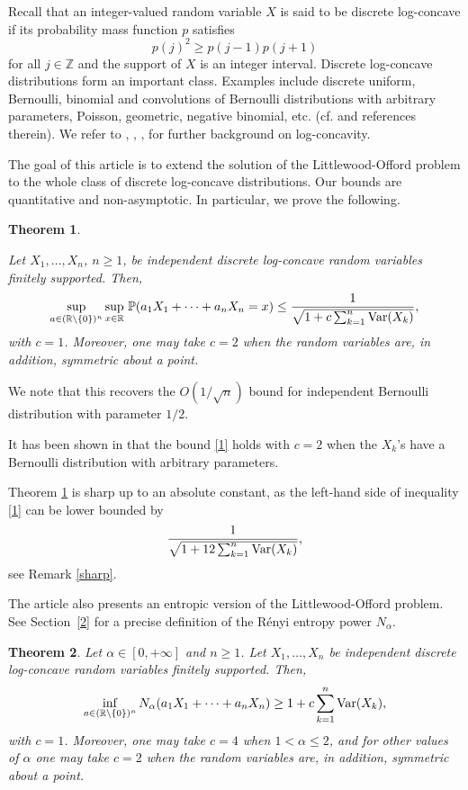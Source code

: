 \documentclass[11pt]{article}
\newtheorem{thm}{Theorem}[section]
\newcommand{\R}{\mathbb{R}}
\DeclareMathOperator{\Var}{Var}
\newcommand{\1}{[1]}
\newcommand{\Prob}{\mathbb{P}}
\def\Var{{\rm Var}}
\begin{document}
Recall that an integer-valued random variable $X$ is said to be discrete log-concave if its probability mass function $p$ satisfies
$$ p(j)^{2} \geq p(j-1)p(j+1) $$
for all $j \in \mathbb{Z}$ and the support of $X$ is an integer interval. Discrete log-concave distributions form an important class. Examples include discrete uniform, Bernoulli, binomial
and convolutions of Bernoulli distributions with arbitrary parameters, Poisson, geometric, negative binomial, etc. (cf. \cite{JG} and references therein). We refer to \cite{Sta}, \cite{Bre}, \cite{SW}, \cite{Bra}  for further background on log-concavity.

The goal of this article is to extend the solution of the Littlewood-Offord problem to the whole class of discrete log-concave distributions. Our bounds are quantitative and non-asymptotic. In particular, we prove the following.


\begin{thm}\label{main1}

Let $X_1, \dots, X_n$, $n \geq 1$, be independent discrete log-concave random variables finitely supported. Then,
\begin{equation}\label{1}
\sup_{a \in (\R \setminus \{0\})^n} \sup_{x \in \R} \, \Prob(a_1 X_1 + \cdots + a_n X_n = x) \leq \frac{1}{\sqrt{1 + c \sum_{k=1}^n \Var(X_k)}},
\end{equation}
with $c=1$. Moreover, one may take $c = 2$ when the random variables are, in addition, symmetric about a point.

\end{thm}

We note that this recovers the $O(1/\sqrt{n})$ bound for independent Bernoulli distribution with parameter $1/2$.

It has been shown in \cite{MMR} that the bound \eqref{1} holds with $c=2$ when the $X_k$'s have a Bernoulli distribution with arbitrary parameters.

Theorem \ref{main1} is sharp up to an absolute constant, as the left-hand side of inequality \eqref{1} can be lower bounded by
$$ \frac{1}{\sqrt{1 + 12\sum_{k=1}^n \Var(X_k)}}, $$
see Remark \ref{sharp}.


The article also presents an entropic version of the Littlewood-Offord problem. See Section~\ref{2} for a precise definition of the R\'enyi entropy power $N_{\alpha}$.

\begin{thm}\label{main2}
Let $\alpha \in [0, +\infty]$ and $n \geq 1$. Let $X_1, \dots, X_n$ be independent discrete log-concave random variables finitely supported. Then,
\begin{equation}\label{entrop}
\inf_{a \in (\R \setminus \{0\})^n} N_\alpha(a_1 X_1 + \cdots + a_n X_n) \geq 1 + c \sum_{k=1}^n \Var(X_k),
\end{equation}
with $c=1$. Moreover, one may take $c = 4$ when $1 < \alpha \leq 2$, and for other values of $\alpha$ one may take $c=2$ when the random variables are, in addition, symmetric about a point.
\end{thm}
\end{document}
